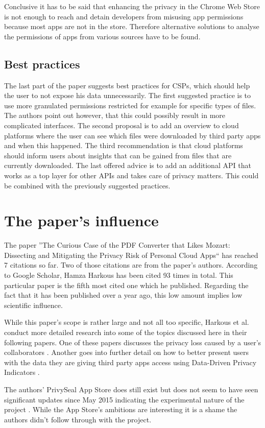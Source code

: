 \documentclass[11pt,twocolumn,a4paper,DIV=calc]{scrartcl}
\begin{document}
Conclusive it has to be said that enhancing the privacy in the Chrome Web Store is not enough to reach and detain developers from misusing app permissions because most apps are not in the store. Therefore alternative solutions to analyse the permissions of apps from various sources have to be found.  
\subsection{Best practices}
The last part of the paper suggests best practices for CSPs, which should help the user to not expose his data unnecessarily. The first suggested practice is to use more granulated permissions restricted for example for specific types of files. The authors point out however, that this could possibly result in more complicated interfaces. The second proposal is to add an overview to cloud platforms where the user can see which files were downloaded by third party apps and when this happened. The third recommendation is that cloud platforms should inform users about insights that can be gained from files that are currently downloaded. The last offered advice is to add an additional API that works as a top layer for other APIs and takes care of privacy matters. This could be combined with the previously suggested practices.
\section{The paper's influence}
The paper ''The Curious Case of the PDF Converter that Likes Mozart: Dissecting and Mitigating the Privacy Risk of Personal Cloud Apps`` has reached 7 citations so far. Two of those citations are from the paper's authors. According to Google Scholar, Hamza Harkous has been cited 93 times in total.
This particular paper is the fifth most cited one which he published. Regarding the fact that it has been published over a year ago, this low amount implies low scientific influence.

While this paper's scope is rather large and not all too specific, Harkous et al. conduct more detailed research into some of the topics discussed here in their following papers. One of these papers discusses the privacy loss caused by a user’s collaborators \cite{HarkousCollaborators}. Another goes into further detail on how to better present users with the data they are giving third party apps access using Data-Driven Privacy Indicators \cite{HarkousDDPI}.

The authors’ PrivySeal App Store does still exist but does not seem to have seen significant updates since May 2015 indicating the experimental nature of the project \cite{PrivySeal}. While the App Store’s ambitions are interesting it is a shame the authors didn’t follow through with the project.
\end{document}
